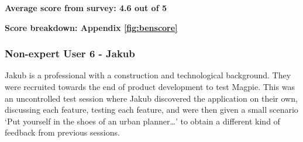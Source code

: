 \textbf{Average score from survey: 4.6 out of 5}

\textbf{Score breakdown: Appendix \ref{fig:benscore}}

\newpage{}

\subsubsection{Non-expert User 6 - Jakub}
Jakub is a professional with a construction and technological background. They
were recruited towards the end of product development to test Magpie. This was
an uncontrolled test session where Jakub discovered the application on their
own, discussing each feature, testing each feature, and were then given a small
scenario `Put yourself in the shoes of an urban planner\ldots' to obtain a
different kind of feedback from previous sessions.

